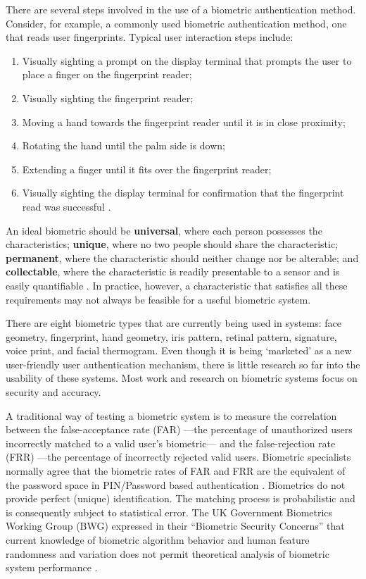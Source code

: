 \documentclass{article}
\begin{document}
There are several steps involved in the use of a biometric authentication method. Consider, for example, a commonly used biometric authentication method, one that reads user fingerprints. Typical user interaction steps include:
\begin{enumerate}
\item Visually sighting a prompt on the display terminal that prompts the user to place a finger on the fingerprint reader;
\item Visually sighting the fingerprint reader;
\item Moving a hand towards the fingerprint reader until it is in close proximity;
\item Rotating the hand until the palm side is down;
\item Extending a finger until it fits over the fingerprint reader;
\item Visually sighting the display terminal for confirmation that the fingerprint read was successful \cite{schultz2001usability}.
\end{enumerate}

An ideal biometric should be \textbf{universal}, where each person possesses the characteristics; \textbf{unique}, where no two people should share the characteristic; \textbf{permanent}, where the characteristic should neither change nor be alterable; and \textbf{collectable}, where the characteristic is readily presentable to a sensor and is easily quantifiable \cite{jain2000biometric}. In practice, however, a characteristic that satisfies all these requirements may not always be feasible for a useful biometric system.

There are eight biometric types that are currently being used in systems: face geometry, fingerprint, hand geometry, iris pattern, retinal pattern, signature, voice print, and facial thermogram. Even though it is being `marketed' as a new user-friendly user authentication mechanism, there is little research so far into the usability of these systems. Most work and research on biometric systems focus on security and accuracy. 

A traditional way of testing a biometric system is to measure the correlation between the false-acceptance rate (FAR) ---the percentage of unauthorized users incorrectly matched to a valid user's biometric--- and the false-rejection rate (FRR) ---the percentage of incorrectly rejected valid users. Biometric specialists normally agree that the biometric rates of FAR and FRR are the equivalent of the password space in PIN/Password based authentication \cite{biometrics2003biometrics}. Biometrics do not provide perfect (unique) identification. The matching process is probabilistic and is consequently subject to statistical error.    The UK Government Biometrics Working Group (BWG) expressed in their “Biometric Security Concerns” that current knowledge of biometric algorithm behavior and human feature randomness and variation does not permit theoretical analysis of biometric system performance \cite{biometrics2003biometrics}.
\end{document}
